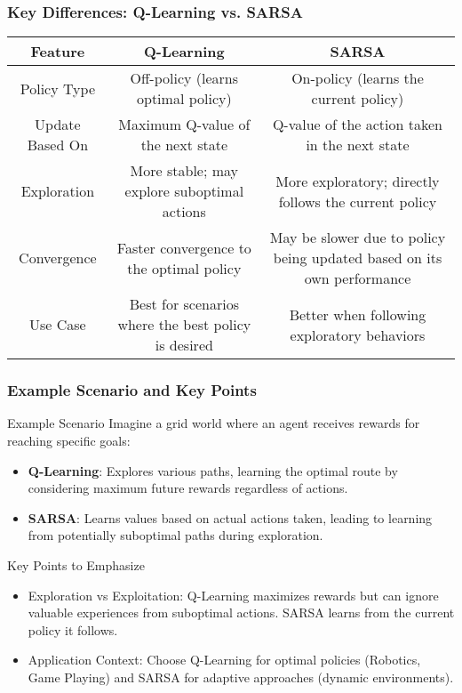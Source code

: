 \documentclass[aspectratio=169]{beamer}
\begin{document}
\begin{frame}[fragile]
    \frametitle{Key Differences: Q-Learning vs. SARSA}
    \begin{table}[ht]
        \centering
        \begin{tabular}{|c|c|c|}
            \hline
            \textbf{Feature} & \textbf{Q-Learning} & \textbf{SARSA} \\
            \hline
            Policy Type & Off-policy (learns optimal policy) & On-policy (learns the current policy) \\
            \hline
            Update Based On & Maximum Q-value of the next state & Q-value of the action taken in the next state \\
            \hline
            Exploration & More stable; may explore suboptimal actions & More exploratory; directly follows the current policy \\
            \hline
            Convergence & Faster convergence to the optimal policy & May be slower due to policy being updated based on its own performance \\
            \hline
            Use Case & Best for scenarios where the best policy is desired & Better when following exploratory behaviors \\
            \hline
        \end{tabular}
    \end{table}
\end{frame}

\begin{frame}[fragile]
    \frametitle{Example Scenario and Key Points}
    \begin{block}{Example Scenario}
        Imagine a grid world where an agent receives rewards for reaching specific goals:
        \begin{itemize}
            \item \textbf{Q-Learning}: Explores various paths, learning the optimal route by considering maximum future rewards regardless of actions.
            \item \textbf{SARSA}: Learns values based on actual actions taken, leading to learning from potentially suboptimal paths during exploration.
        \end{itemize}
    \end{block}

    \begin{block}{Key Points to Emphasize}
        \begin{itemize}
            \item Exploration vs Exploitation: Q-Learning maximizes rewards but can ignore valuable experiences from suboptimal actions. SARSA learns from the current policy it follows.
            \item Application Context: Choose Q-Learning for optimal policies (Robotics, Game Playing) and SARSA for adaptive approaches (dynamic environments).
        \end{itemize}
    \end{block}
\end{frame}
\end{document}
